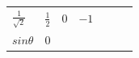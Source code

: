 {\begin{center}
\begin{xtabular*}{\mytablewidth}[t]{|p{10\mystarwidth}|p{10\mystarwidth}|p{10\mystarwidth}|p{10\mystarwidth}|p{10\mystarwidth}|p{10\mystarwidth}|p{10\mystarwidth}|}
    
        
                \begin{math}\frac{1}{\sqrt{2}}\end{math}
               &
    
    
        
                \begin{math}\frac{1}{2}\end{math}
               &
    
    
        0 &
    
    
        
                \begin{math}-1\end{math}
     \tabularnewline{}
    
    
        
                \begin{math}sin\theta \end{math}
               &
    
    
        0 &
    

\end{xtabular*}
\end{center}}
